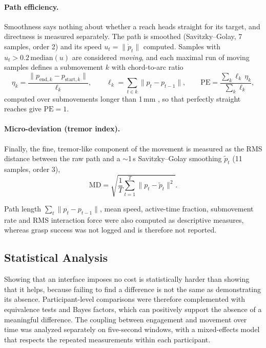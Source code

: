 \documentclass[utf8]{frontiers_suppmat}
\begin{document}
\paragraph*{Path efficiency.} Smoothness says nothing about whether a reach heads straight for its target, and directness is measured separately. The path is smoothed (Savitzky--Golay, 7 samples, order 2) and its speed $u_t=\|\dot p_t\|$ computed. Samples with $u_t>0.2\,\mathrm{median}(u)$ are considered \emph{moving}, and each maximal run of moving samples defines a submovement $k$ with chord-to-arc ratio
\begin{equation}\label{eq:pe}
\eta_k=\frac{\|p_{\mathrm{end},k}-p_{\mathrm{start},k}\|}{\ell_k},\qquad \ell_k=\sum_{t\in k}\|p_{t}-p_{t-1}\|,\qquad \mathrm{PE}=\frac{\sum_k\ell_k\,\eta_k}{\sum_k\ell_k},
\end{equation}
computed over submovements longer than 1\,mm \cite{Jackson2013}, so that perfectly straight reaches give $\mathrm{PE}=1$.

\paragraph*{Micro-deviation (tremor index).} Finally, the fine, tremor-like component of the movement is measured as the RMS distance between the raw path and a $\sim$1\,s Savitzky--Golay smoothing $\tilde p_t$ (11 samples, order 3),
\begin{equation}\label{eq:micro}
\mathrm{MD}=\sqrt{\frac1T\sum_{t=1}^{T}\|p_t-\tilde p_t\|^{2}} .
\end{equation}

Path length $\sum_t\|p_t-p_{t-1}\|$, mean speed, active-time fraction, submovement rate and RMS interaction force were also computed as descriptive measures, whereas grasp success was not logged and is therefore not reported.

\subsection{Statistical Analysis}
Showing that an interface imposes no cost is statistically harder than showing that it helps, because failing to find a difference is not the same as demonstrating its absence. Participant-level comparisons were therefore complemented with equivalence tests and Bayes factors, which can positively support the absence of a meaningful difference. The coupling between engagement and movement over time was analyzed separately on five-second windows, with a mixed-effects model that respects the repeated measurements within each participant.
\end{document}
